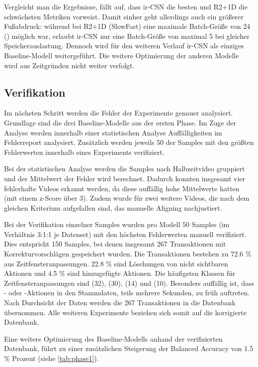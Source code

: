 Vergleicht man die Ergebnisse, fällt auf, dass ir-CSN die besten und R2+1D die schwächsten Metriken vorweist.
Damit einher geht allerdings auch ein größerer Fußabdruck:
während bei R2+1D (\bzw SlowFast) eine maximale Batch-Größe von 24 () möglich war, erlaubt ir-CSN nur eine Batch-Größe von maximal 5 bei gleicher Speicherauslastung.
Dennoch wird für den weiteren Verlauf ir-CSN als einziges Baseline-Modell weitergeführt.
Die weitere Optimierung der anderen Modelle wird aus Zeitgründen nicht weiter verfolgt.

\subsection{Verifikation}
\label{sec:verifikation}

Im nächsten Schritt werden die Fehler der Experimente genauer analysiert.
Grundlage sind die drei Baseline-Modelle aus der ersten Phase.
Im Zuge der Analyse werden innerhalb einer statistischen Analyse Auffälligkeiten im Fehlerreport analysiert.
Zusätzlich werden jeweils 50 der Samples mit den größten Fehlerwerten innerhalb eines Experiments verifiziert.

Bei der statistischen Analyse werden die Samples nach Halbzeitvideo gruppiert und der Mittelwert der Fehler wird berechnet.
Dadurch konnten insgesamt vier fehlerhafte Videos erkannt werden, da diese auffällig hohe Mittelwerte hatten (mit einem z-Score über 3).
Zudem wurde für zwei weitere Videos, die nach dem gleichen Kriterium aufgefallen sind, das manuelle Aligning nachjustiert.

Bei der Verifikation einzelner Samples wurden pro Modell 50 Samples (im Verhältnis 3:1:1 je Datenset) mit den höchsten Fehlerwerten manuell verifiziert.
Dies entspricht 150 Samples, bei denen insgesamt 267 Transaktionen mit Korrekturvorschlägen gespeichert wurden.
Die Transaktionen bestehen zu 72.6 \% aus Zeitfensteranpassungen.
22.8 \% sind Löschungen von nicht sichtbaren Aktionen und 4.5 \% sind hinzugefügte Aktionen.
Die häufigsten Klassen für Zeitfensteranpassungen sind  (32),  (30),  (14) und  (10).
Besonders auffällig ist, dass \zB {}- oder -Aktionen in den Stammdaten, teils mehrere Sekunden, zu früh auftreten.
Nach Durchsicht der Daten werden die 267 Transaktionen in die Datenbank übernommen.
Alle weiteren Experimente beziehen sich somit auf die korrigierte Datenbank.

Eine weitere Optimierung des Baseline-Modells anhand der verifizierten Datenbank, führt zu einer zusätzlichen Steigerung der Balanced Accuracy von 1.5 \% Prozent (siehe \autoref{tab:phase1}).

